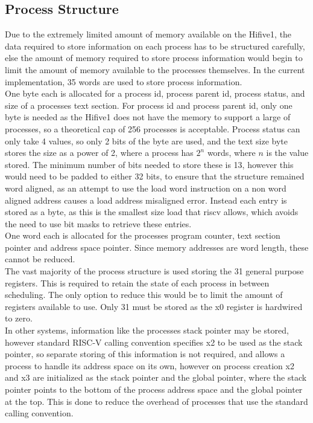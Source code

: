 \subsection{Process Structure}
Due to the extremely limited amount of memory available on the Hifive1, the data required to store information on each process has to be structured carefully, else the amount of memory required to store process information would begin to limit the amount of memory available to the processes themselves. In the current implementation, 35 words are used to store process information.
\\
One byte each is allocated for a process id, process parent id, process status, and size of a processes text section. For process id and process parent id, only one byte is needed as the Hifive1 does not have the memory to support a large of processes, so a theoretical cap of 256 processes is acceptable. Process status can only take 4 values, so only 2 bits of the byte are used, and the text size byte stores the size as a power of 2, where a process has \(2^n\) words, where \(n\) is the value stored. The minimum number of bits needed to store these is 13, however this would need to be padded to either 32 bits, to ensure that the structure remained word aligned, as an attempt to use the load word instruction on a non word aligned address causes a load address misaligned error. Instead each entry is stored as a byte, as this is the smallest size load that \gls{riscv} allows, which avoids the need to use bit masks to retrieve these entries.
\\
One word each is allocated for the processes program counter, text section pointer and address space pointer. Since memory addresses are word length, these cannot be reduced.
\\
The vast majority of the process structure is used storing the 31 general purpose registers. This is required to retain the state of each process in between scheduling. The only option to reduce this would be to limit the amount of registers available to use. Only 31 must be stored as the x0 register is hardwired to zero.
\\
In other systems, information like the processes stack pointer may be stored, however standard RISC-V calling convention specifies x2 to be used as the stack pointer, so separate storing of this information is not required, and allows a process to handle its address space on its own, however on process creation x2 and x3 are initialized as the stack pointer and the global pointer, where the stack pointer points to the bottom of the process address space and the global pointer at the top. This is done to reduce the overhead of processes that use the standard calling convention.
